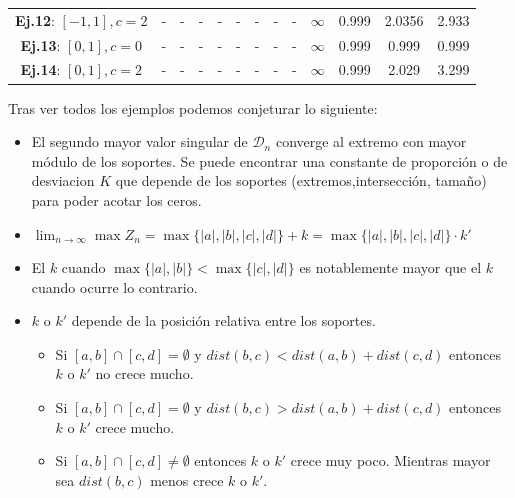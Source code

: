 \begin{table}
\begin{tabular}{|c|cccc|cccc|cccc|}
		\textbf{Ej.12}: $[-1,1], c=2$              & -                                             & -                                                & -                                   & -        & -              & -              & -                       & -        & $\infty$       & 0.999          & 2.0356                  & 2.933    \\
		\textbf{Ej.13}: $[0,1], c=0$               & -                                             & -                                                & -                                   & -        & -              & -              & -                       & -        & $\infty$       & 0.999          & 0.999                   & 0.999    \\
		\textbf{Ej.14}: $[0,1], c=2$               & -                                             & -                                                & -                                   & -        & -              & -              & -                       & -        & $\infty$       & 0.999          & 2.029                   & 3.299    \\
		\hline
	\end{tabular}
\end{table}

\newpage

Tras ver todos los ejemplos podemos conjeturar lo siguiente:

\begin{itemize}
	\item El segundo mayor valor singular de $\mathcal{D}_{n}$ converge al extremo con mayor módulo de los soportes. Se puede encontrar una constante de proporción o de desviacion $K$ que depende de los soportes (extremos,intersección, tamaño) para poder acotar los ceros.
	\item $\lim_{n \to \infty} \max{Z_n}=\max\{|a|,|b|,|c|,|d|\} + k = \max\{|a|,|b|,|c|,|d|\} \cdot k'$
	\item El $k$ cuando $\max\{|a|,|b|\} < \max\{|c|,|d|\}$ es notablemente mayor que el $k$ cuando ocurre lo contrario.
	\item $k$ o $k'$ depende de la posición relativa entre los soportes.
	      \begin{itemize}
		      \item Si $[a,b] \cap [c,d] = \emptyset$ y $dist(b,c) < dist(a,b) + dist(c,d)$ entonces $k$ o $k'$ no crece mucho.
		      \item Si $[a,b] \cap [c,d] = \emptyset$ y $dist(b,c) > dist(a,b) + dist(c,d)$ entonces $k$ o $k'$ crece mucho.
		      \item Si $[a,b] \cap [c,d] \neq \emptyset$ entonces $k$ o $k'$ crece muy poco. Mientras mayor sea $dist(b,c)$ menos crece $k$ o $k'$.
	      \end{itemize}
\end{itemize}

